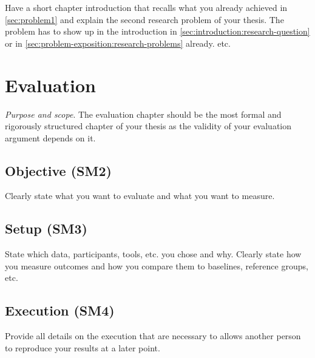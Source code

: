 \documentclass[
  fontsize=10pt
  numbers=noenddot,
  english,  %
  paper=a5,
  twoside,  %
  DIV=calc,
  headings=small,
  bibliography=totoc,
  listof=totoc,
  draft=false
]{scrbook}
\theoremstyle{break}
\begin{document}
Have a short chapter introduction that recalls what you already achieved in \cref{sec:problem1} and explain the second research problem of your thesis. The problem has to show up in the introduction in \cref{sec:introduction:research-question} or in \cref{sec:problem-exposition:research-problems} already. etc.

\chapter{Evaluation}\label{sec:evaluation}

\emph{Purpose and scope}. The evaluation chapter should be the most formal and rigorously structured chapter of your thesis as the validity of your evaluation argument depends on it.

\section{Objective (SM2)}\label{sec:evaluation:objective}

Clearly state what you want to evaluate and what you want to measure.

\section{Setup (SM3)}\label{sec:evaluation:setup}

State which data, participants, tools, etc. you chose and why. Clearly state how you measure outcomes and how you compare them to baselines, reference groups, etc.

\section{Execution (SM4)}\label{sec:evaluation:execution}

Provide all details on the execution that are necessary to allows another person to reproduce your results at a later point.
\end{document}
